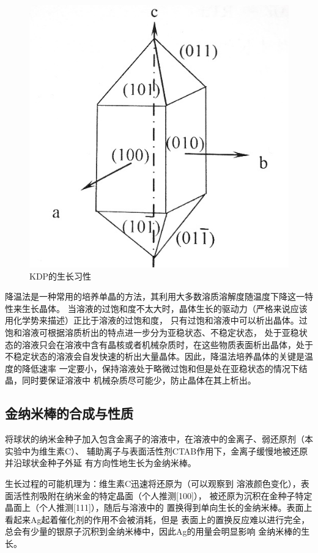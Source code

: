 \documentclass[a4paper,zihao=5,UTF8]{ctexart}
\begin{document}
    \begin{figure}[htbp]
        \centering 
        \includegraphics[scale=0.8]{KDPgrow.png}
        \caption{KDP的生长习性}
        \label{KDP crystal grow}
    \end{figure}
    \par 
    降温法是一种常用的培养单晶的方法，其利用大多数溶质溶解度随温度下降这一特性来生长晶体。
    当溶液的过饱和度不太大时，晶体生长的驱动力（严格来说应该用化学势来描述）正比于溶液的过饱和度，
    只有过饱和溶液中可以析出晶体。过饱和溶液可根据溶质析出的特点进一步分为亚稳状态、不稳定状态，
    处于亚稳状态的溶液只会在溶液中含有晶核或者机械杂质时，在这些物质表面析出晶体，处于
    不稳定状态的溶液会自发快速的析出大量晶体。因此，降温法培养晶体的关键是温度的降低速率
    一定要小，保持溶液处于略微过饱和但是处在亚稳状态的情况下结晶，同时要保证溶液中
    机械杂质尽可能少，防止晶体在其上析出。
    \subsection{金纳米棒的合成与性质}
    将球状的纳米金种子加入包含金离子的溶液中，在溶液中的金离子、弱还原剂（本实验中为维生素C）、
    辅助离子与表面活性剂CTAB作用下，金离子缓慢地被还原并沿球状金种子外延
    有方向性地生长为金纳米棒。
    \par 
    生长过程的可能机理为：维生素C迅速将还原为（可以观察到
    溶液颜色变化），表面活性剂吸附在纳米金的特定晶面（个人推测[100]），
    被还原为沉积在金种子特定晶面上（个人推测[111]），随后与溶液中的
    置换得到单向生长的金纳米棒。表面上看起来Ag起着催化剂的作用不会被消耗，但是
    表面上的置换反应难以进行完全，总会有少量的银原子沉积到金纳米棒中，因此Ag的用量会明显影响
    金纳米棒的生长。
\end{document}
